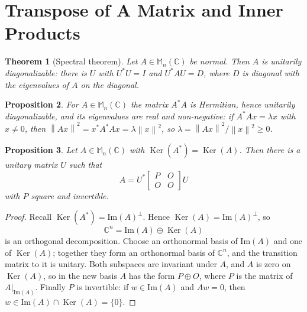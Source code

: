 \documentclass[12pt]{article}
\newcommand{\norm}[1]{\left\lVert #1 \right\rVert}
\DeclareMathOperator{\Ker}{Ker}
\theoremstyle{breakplain}
\newtheorem{theorem}{Theorem}[section]
\newtheorem{prop}[theorem]{Proposition}
\theoremstyle{breakdef}
\theoremstyle{remark}
\begin{document}
\newpage
\section{Transpose of A Matrix and Inner Products}
\begin{theorem}[Spectral theorem]
    Let $A\in\mathbb{M}_n(\mathbb{C})$ be normal. Then $A$ is unitarily diagonalizable: there is $U$ with $U^*U=I$ and $U^*AU=D$, where $D$ is diagonal with the eigenvalues of $A$ on the diagonal.
\end{theorem}
\begin{prop}
    For $A\in \mathbb{M}_n(\mathbb{C})$ the matrix $A^*A$ is Hermitian, hence unitarily diagonalizable, and its eigenvalues are real and non-negative: if $A^*Ax=\lambda x$ with $x\neq0$, then $\norm{Ax}^2=x^*A^*Ax=\lambda\norm{x}^2$, so $\lambda = \norm{Ax}^2/\norm{x}^2\geq0$.
\end{prop}

\begin{prop}\label{prop:KA}
    Let $A\in\mathbb{M}_n(\mathbb{C})$ with $\Ker(A^*)=\Ker(A)$. Then there is a unitary matrix $U$ such that
    \[A=U^*\begin{bmatrix}
        P & O\\
        O & O
    \end{bmatrix}U\]
    with $P$ square and invertible.
\end{prop}
\begin{proof}
    Recall $\Ker(A^*)=\mathrm{Im}(A)^\perp$. Hence $\Ker(A)=\mathrm{Im}(A)^\perp$, so
    \[\mathbb{C}^n=\mathrm{Im}(A) \oplus \Ker(A)\]
    is an orthogonal decomposition. Choose an orthonormal basis of $\mathrm{Im}(A)$ and one of $\Ker(A)$; together they form an orthonormal basis of $\mathbb{C}^n$, and the transition matrix to it is unitary. Both subspaces are invariant under $A$, and $A$ is zero on $\Ker(A)$, so in the new basis $A$ has the form $P\oplus O$, where $P$ is the matrix of $A|_{\mathrm{Im}(A)}$. Finally $P$ is invertible: if $w\in\mathrm{Im}(A)$ and $Aw=0$, then $w\in \mathrm{Im}(A)\cap\Ker(A)=\{0\}$.
\end{proof}
\end{document}
